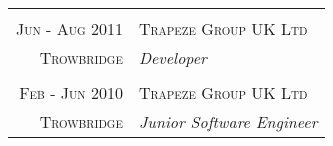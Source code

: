 \begin{tabular}{r|p{11cm}}
\multicolumn{2}{c}{} \\


\textsc{Jun - Aug 2011} & \textsc{Trapeze Group UK Ltd}\\ 
\textsc{Trowbridge} & \emph{Developer}\\

\multicolumn{2}{c}{} \\


\textsc{Feb - Jun 2010} & \textsc{Trapeze Group UK Ltd}\\ 
\textsc{Trowbridge} & \emph{Junior Software Engineer}\\

\end{tabular}